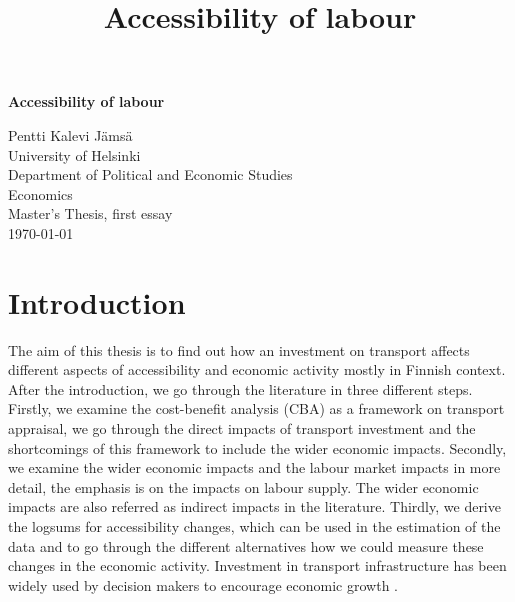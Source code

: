 \documentclass[a4paper, 12 pt]{article}   	%
\title{Accessibility of labour}
\begin{document}
\begin{titlepage} %
\begin{center}	
	\vspace*{\fill}
   	
	{\Huge\bfseries Accessibility of labour}
	\end{center}
	
	\vfill
	\raggedleft
	{\Large Pentti Kalevi Jämsä}\\
	\vspace{1.5mm}
	\raggedleft
	{\Large University of Helsinki}\\
	\vspace{1.5mm}
	{\Large Department of Political and Economic Studies}\\
	\vspace{1.5mm}
	{\Large Economics}\\
	\vspace{1.5mm}
	{\Large Master's Thesis, first essay}\\
\vspace{1.5mm}
	{\Large \today}
	
\end{titlepage}

\tableofcontents
\newpage

\nocite{geurs, melo, laakso, venables2007, venables2017, andersson, mackie, marshall, pilegaard, small, liikenne, goebel, brueckner, alonso, mills, muth, mcmillen, fujita}

\section{Introduction}

The aim of this thesis is to  find out how an investment on transport affects different aspects of accessibility and economic activity mostly in Finnish context. After the introduction, we go through the literature in three different steps. Firstly, we examine the cost-benefit analysis (CBA) as a framework on transport appraisal, we go through the direct impacts of transport investment and the shortcomings of this framework to include the wider economic impacts. Secondly, we examine the wider economic impacts and the labour market impacts in more detail, the emphasis is on the impacts on labour supply. The wider economic impacts are also referred as indirect impacts in the literature. Thirdly, we derive the logsums for accessibility changes, which can be used in the estimation of the data and to go through the different alternatives how we could measure these changes in the economic activity. Investment in transport infrastructure has been widely used by decision makers to encourage economic growth \citep{melo}.  \\ 
\end{document}
